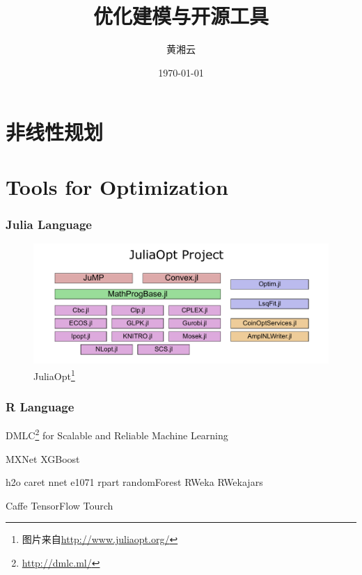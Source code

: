 \documentclass[10pt,UTF8]{beamer}\usepackage[]{graphicx}\usepackage[]{color}
\title{优化建模与开源工具}
\author{黄湘云}
\institute{计算数学与统计系，理学院}
\date{\today}
\begin{document}
\frame{\titlepage}

\section{非线性规划}
























\section{Tools for Optimization}

\begin{frame}
\frametitle{Julia Language}
\begin{figure}[htbp]
  \centering
\includegraphics[width=\textwidth]{figure/JuliaOpt.pdf}
  \caption{JuliaOpt\footnote{图片来自\url{http://www.juliaopt.org/}}}\label{fig:JuliaOpt}
\end{figure}
\end{frame}

\begin{frame}
\frametitle{R Language}
{\color{blue}\textsf{DMLC}}\footnote{\url{http://dmlc.ml/}} for Scalable and Reliable Machine Learning 

MXNet
XGBoost

h2o
caret
nnet
e1071
rpart
randomForest
RWeka RWekajars

Caffe
TensorFlow
Tourch
\end{frame}
\end{document}

